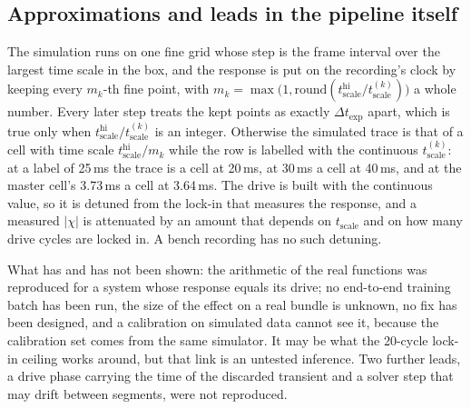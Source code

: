 \documentclass[10pt,a4paper]{article}
\newcommand{\tscale}{t_{\mathrm{scale}}}
\begin{document}
\subsection{Approximations and leads in the pipeline itself}

\begin{notebox}[title={A lead on the time scale (reproduced for an ideal response, not yet audited end to end)}]
The simulation runs on one fine grid whose step is the frame interval over the largest time scale in the box, and the
response is put on the recording's clock by keeping every $m_k$-th fine point, with $m_k=\max\bigl(1,\mathrm{round}(
t^{\mathrm{hi}}_{\mathrm{scale}}/t^{(k)}_{\mathrm{scale}})\bigr)$ a whole number. Every later step treats the kept points as
exactly $\Delta t_{\exp}$ apart, which is true only when $t^{\mathrm{hi}}_{\mathrm{scale}}/t^{(k)}_{\mathrm{scale}}$ is an integer.
Otherwise the simulated trace is that of a cell with time scale $t^{\mathrm{hi}}_{\mathrm{scale}}/m_k$ while the row is labelled with
the continuous $t^{(k)}_{\mathrm{scale}}$: at a label of 25\,ms the trace is a cell at 20\,ms, at 30\,ms a cell at 40\,ms, and at
the master cell's 3.73\,ms a cell at 3.64\,ms. The drive is built with the continuous value, so it is detuned from the lock-in
that measures the response, and a measured $|\chi|$ is attenuated by an amount that depends on $\tscale$ and on how many drive
cycles are locked in. A bench recording has no such detuning.

What has and has not been shown: the arithmetic of the real functions was reproduced for a system whose response equals its
drive; no end-to-end training batch has been run, the size of the effect on a real bundle is unknown, no fix has been
designed, and a calibration on simulated data cannot see it, because the calibration set comes from the same simulator. It may
be what the 20-cycle lock-in ceiling works around, but that link is an untested inference. Two further leads, a drive phase
carrying the time of the discarded transient and a solver step that may drift between segments, were not reproduced.
\end{notebox}
\end{document}
